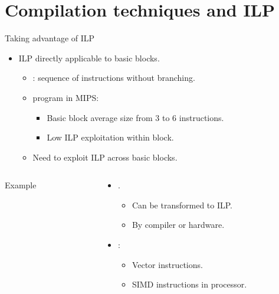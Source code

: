 \section{Compilation techniques and ILP}

\begin{frame}[t]{Taking advantage of ILP}
\begin{itemize}
  \item ILP directly applicable to basic blocks.
    \begin{itemize}
      \item {}: sequence of instructions without branching.
      \item {} program in MIPS:
        \begin{itemize}
          \item Basic block average size from 3 to 6 instructions.
          \item Low ILP exploitation within block.
        \end{itemize}
      \item Need to exploit ILP across basic blocks.
    \end{itemize}
\end{itemize}

\begin{columns}

  \begin{column}{.4\textwidth}
    \begin{block}{Example}
      
    \end{block}
  \end{column}

  \begin{column}{.6\textwidth}
    \begin{itemize}
      \item {}.
        \begin{itemize}
          \item Can be transformed to ILP.
          \item By compiler or hardware.
        \end{itemize}
      \item {}:
        \begin{itemize}
          \item Vector instructions.
          \item SIMD instructions in processor.
        \end{itemize}
    \end{itemize}
  \end{column}
\end{columns}
\end{frame}

